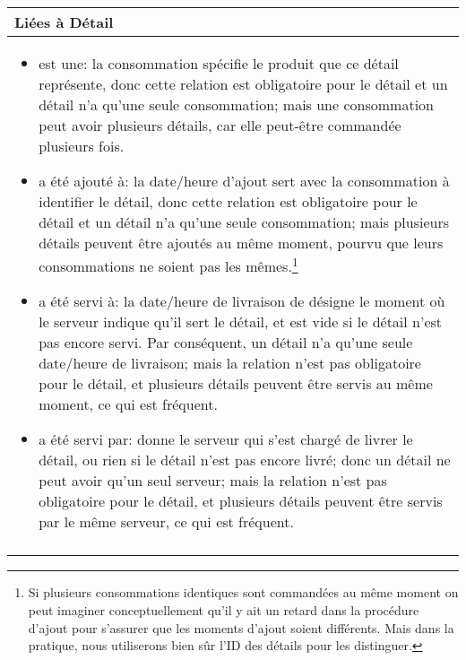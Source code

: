 \documentclass[a4paper,10pt]{article}
\begin{document}
\begin{tabu}{X}
\textbf{Liées à Détail}\\
\toprule

\begin{itemize}
    \item est une: la consommation spécifie le produit que ce détail représente, donc cette relation est obligatoire pour le détail et un détail n'a qu'une seule consommation; mais une consommation peut avoir plusieurs détails, car elle peut-être commandée plusieurs fois.
    \item a été ajouté à: la date/heure d'ajout sert avec la consommation à identifier le détail, donc cette relation est obligatoire pour le détail et un détail n'a qu'une seule consommation; mais plusieurs détails peuvent être ajoutés au même moment, pourvu que leurs consommations ne soient pas les mêmes.\footnote{Si plusieurs consommations identiques sont commandées au même moment on peut imaginer conceptuellement qu'il y ait un retard dans la procédure d'ajout pour s'assurer que les moments d'ajout soient différents. Mais dans la pratique, nous utiliserons bien sûr l'ID des détails pour les distinguer.}
    \item a été servi à: la date/heure de livraison de désigne le moment où le serveur indique qu'il sert le détail, et est vide si le détail n'est pas encore servi. Par conséquent, un détail n'a qu'une seule date/heure de livraison; mais la relation n'est pas obligatoire pour le détail, et plusieurs détails peuvent être servis au même moment, ce qui est fréquent.
    \item a été servi par: donne le serveur qui s'est chargé de livrer le détail, ou rien si le détail n'est pas encore livré; donc un détail ne peut avoir qu'un seul serveur; mais la relation n'est pas obligatoire pour le détail, et plusieurs détails peuvent être servis par le même serveur, ce qui est fréquent.
\end{itemize}
\\\\
\end{tabu}
\end{document}

